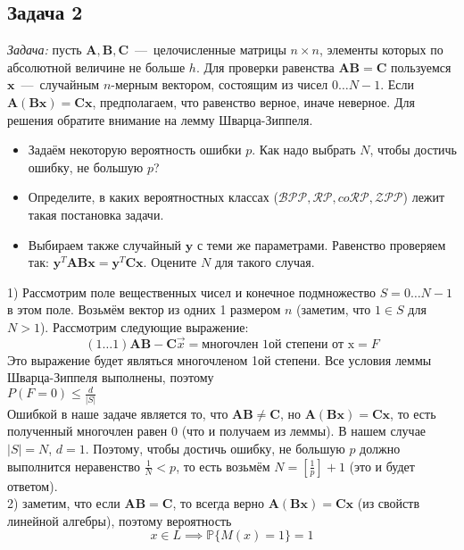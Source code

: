 \documentclass[a4paper,12pt]{article} %
\begin{document}
\subsection*{Задача 2}
\textit{Задача:} пусть $\mathbf{A}, \mathbf{B}, \mathbf{C}$~---~целочисленные матрицы $n\times n$, элементы которых по абсолютной величине не больше $h$. Для проверки равенства $\mathbf{AB}=\mathbf{C}$ пользуемся $\mathbf{x}$~---~случайным $n$-мерным вектором, состоящим из чисел $0\dotsc N-1$. Если $\mathbf{A}(\mathbf{B}\mathbf {x}) = \mathbf{C}\mathbf{x}$, предполагаем, что равенство верное, иначе неверное. Для решения обратите внимание на лемму Шварца-Зиппеля.
\begin{itemize}
\item Задаём некоторую вероятность ошибки $p$. Как надо выбрать $N$, чтобы достичь ошибку, не большую $p$?
\item Определите, в каких вероятностных классах ($\mathcal{BPP}, \mathcal{RP}, co\mathcal{RP}, \mathcal{ZPP}$) лежит такая постановка задачи.
\item Выбираем также случайный $\mathbf{y}$ с теми же параметрами. Равенство проверяем так: $\mathbf{y}^T\mathbf{AB}\mathbf{x} = \mathbf{y}^T\mathbf{C}\mathbf{x}$. Оцените $N$ для такого случая.\\
\end{itemize}\smallskip 

1) Рассмотрим поле вещественных чисел и конечное подмножество $ S = 0\dotsc N-1 $ в этом поле. Возьмём вектор из одних 1 размером $ n $ (заметим, что $ 1 \in S $ для $ N >1 $). Рассмотрим следующие выражение:
$$
(1 \ldots 1) \mathbf{AB - C} \overrightarrow{x} = \text{многочлен 1ой степени от x} = F
$$ 
Это выражение будет являться многочленом 1ой степени. Все условия леммы Шварца-Зиппеля выполнены, поэтому \\
$ P(F = 0) \leqslant \frac{d}{|S|} $\\
Ошибкой в наше задаче является то, что $\mathbf{AB}\neq\mathbf{C}$, но $\mathbf{A}(\mathbf{B}\mathbf {x}) = \mathbf{C}\mathbf{x}$, то есть полученный многочлен равен 0 (что и получаем из леммы). В нашем случае $ |S| = N $, $ d = 1 $. Поэтому, чтобы достичь ошибку, не большую $p$ должно выполнится неравенство $ \frac{1}{N} < p $, то есть возьмём $ N = \left[\frac{1}{p} \right] + 1 $ (это и будет ответом).\\

2) заметим, что если $\mathbf{AB}=\mathbf{C}$, то всегда верно $\mathbf{A}(\mathbf{B}\mathbf {x}) = \mathbf{C}\mathbf{x}$ (из свойств линейной алгебры), поэтому вероятность
\[
x \in L \implies \mathbb{P}\{M(x)=1\} = 1
\]
\end{document}
